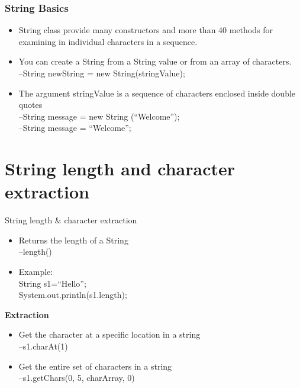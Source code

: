 \documentclass{beamer}
\begin{document}
\begin{frame}
\frametitle{String Basics}
\begin{itemize}
\item String class provide many constructors and more
than 40 methods for examining in individual
characters in a sequence.\\
\item You can create a String from a String value or from an
array of characters.\\
–String newString = new String(stringValue);\\
\item The argument stringValue is a sequence of characters
enclosed inside double quotes\\
–String message = new String (“Welcome”);\\
–String message = “Welcome”;
\end{itemize}
\end{frame}



\section{String length and character extraction}

\begin{frame}{String length \& character extraction}
\begin{itemize}
\item Returns the length of a String\\
–length()\\
\item Example:\\
String s1=“Hello”; \\
System.out.println(s1.length);
\end{itemize}

\textbf{Extraction}
\begin{itemize}
\item Get the character at a specific location in a string\\
–s1.charAt(1)
\item Get the entire set of characters in a string\\
–s1.getChars(0, 5, charArray, 0)
\end{itemize}

\end{frame}
\end{document}

